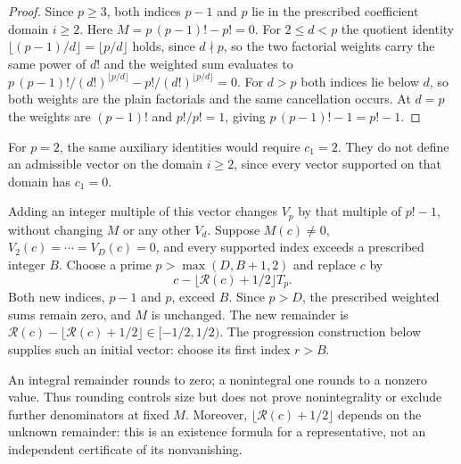 \begin{proof}
Since $p\ge3$, both indices $p-1$ and $p$ lie in the prescribed coefficient
domain $i\ge2$.  Here $M=p\,(p-1)!-p!=0$.  For $2\le d<p$ the quotient identity
$\lfloor(p-1)/d\rfloor=\lfloor p/d\rfloor$ holds, since $d\nmid p$, so the
two factorial weights carry the same power of $d!$ and the weighted sum evaluates to
$p\,(p-1)!/(d!)^{\lfloor p/d\rfloor}-p!/(d!)^{\lfloor p/d\rfloor}=0$.  For
$d>p$ both indices lie below $d$, so both weights are the plain factorials
and the same cancellation occurs.  At $d=p$ the weights are $(p-1)!$ and
$p!/p!=1$, giving $p\,(p-1)!-1=p!-1$.
\end{proof}

For $p=2$, the same auxiliary identities would require $c_1=2$.  They do
not define an admissible vector on the domain $i\ge2$, since every vector
supported on that domain has $c_1=0$.

\noindent Adding an integer multiple of this vector changes $V_p$ by
that multiple of $p!-1$, without changing $M$ or any other $V_d$.
Suppose $M(c)\ne0$, $V_2(c)=\cdots=V_D(c)=0$, and every
supported index exceeds a prescribed integer $B$. Choose a prime
$p>\max(D,B+1,2)$ and replace $c$ by
\[
 c-\lfloor\mathcal R(c)+1/2\rfloor T_p.
\]
Both new indices, $p-1$ and $p$, exceed $B$. Since $p>D$, the prescribed
weighted sums remain zero, and $M$ is unchanged. The new remainder is
$\mathcal R(c)-\lfloor\mathcal R(c)+1/2\rfloor\in[-1/2,1/2)$.
The progression construction below supplies such an initial vector:
choose its first index $r>B$.

An integral remainder rounds to zero; a nonintegral one rounds to a
nonzero value. Thus rounding controls size but does not prove
nonintegrality or exclude further denominators at fixed $M$.
Moreover, $\lfloor\mathcal R(c)+1/2\rfloor$ depends on the unknown
remainder: this is an existence formula for a representative, not an
independent certificate of its nonvanishing.

